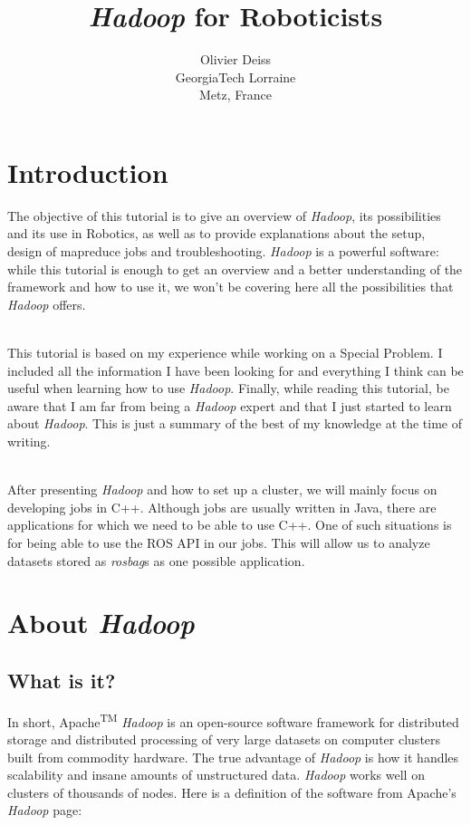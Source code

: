 \documentclass[a4paper, 12pt]{article}
\title{\textit{Hadoop} for Roboticists}
\author{Olivier Deiss\\GeorgiaTech Lorraine\\Metz, France}
\begin{document}
\maketitle
\tableofcontents

\section{Introduction}

The objective of this tutorial is to give an overview of \textit{Hadoop}, its possibilities and its use in Robotics, as well as to provide explanations about the setup, design of mapreduce jobs and troubleshooting. \textit{Hadoop} is a powerful software: while this tutorial is enough to get an overview and a better understanding of the framework and how to use it, we won't be covering here all the possibilities that \textit{Hadoop} offers.

~\\
This tutorial is based on my experience while working on a Special Problem. I included all the information I have been looking for and everything I think can be useful when learning how to use \textit{Hadoop}. Finally, while reading this tutorial, be aware that I am far from being a \textit{Hadoop} expert and that I just started to learn about \textit{Hadoop}. This is just a summary of the best of my knowledge at the time of writing.

~\\
After presenting \textit{Hadoop} and how to set up a cluster, we will mainly focus on developing jobs in C++. Although jobs are usually written in Java, there are applications for which we need to be able to use C++. One of such situations is for being able to use the ROS API in our jobs. This will allow us to analyze datasets stored as \textit{rosbag}s as one possible application.

\section{About \textit{Hadoop}}

  \subsection{What is it?}

In short, Apache\textsuperscript{TM} \textit{Hadoop}\textsuperscript{\textregistered} is an open-source software framework for distributed storage and distributed processing of very large datasets on computer clusters built from commodity hardware. The true advantage of \textit{Hadoop} is how it handles scalability and insane amounts of unstructured data. \textit{Hadoop} works well on clusters of thousands of nodes. Here is a definition of the software from Apache's \textit{Hadoop} page:
\end{document}
